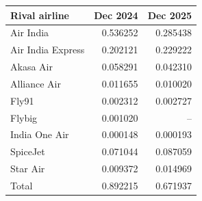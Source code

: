 \begin{tabular}{@{}lrr@{}}
\toprule
Rival airline & Dec 2024 & Dec 2025 \\
\midrule
Air India & 0.536252 & 0.285438 \\
Air India Express & 0.202121 & 0.229222 \\
Akasa Air & 0.058291 & 0.042310 \\
Alliance Air & 0.011655 & 0.010020 \\
Fly91 & 0.002312 & 0.002727 \\
Flybig & 0.001020 & -- \\
India One Air & 0.000148 & 0.000193 \\
SpiceJet & 0.071044 & 0.087059 \\
Star Air & 0.009372 & 0.014969 \\
\midrule
Total & 0.892215 & 0.671937 \\
\bottomrule
\end{tabular}
